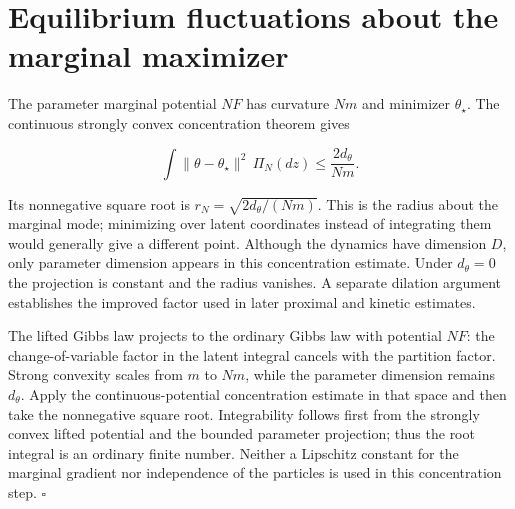 \documentclass[11pt,a4paper]{report}
\begin{document}
\section{\texorpdfstring{Equilibrium fluctuations about the marginal maximizer}{Equilibrium fluctuations about the marginal maximizer}}



The parameter marginal potential \(NF\) has curvature \(Nm\) and minimizer \(\theta_\star\). The continuous strongly convex concentration theorem \cite[Section~3.49.7]{LangevinLean2026ULASC} gives

\[\int\|\theta-\theta_\star\|^2\,\Pi_N(dz)\le\frac{2d_\theta}{Nm}.\]

Its nonnegative square root is \(r_N=\sqrt{2d_\theta/(Nm)}\). This is the radius about the marginal mode; minimizing over latent coordinates instead of integrating them would generally give a different point. Although the dynamics have dimension \(D\), only parameter dimension appears in this concentration estimate. Under \(d_\theta=0\) the projection is constant and the radius vanishes. A separate dilation argument establishes the improved factor used in later proximal and kinetic estimates.




The lifted Gibbs law projects to the ordinary Gibbs law with potential \(NF\): the change-of-variable factor in the latent integral cancels with the partition factor. Strong convexity scales from \(m\) to \(Nm\), while the parameter dimension remains \(d_\theta\). Apply the continuous-potential concentration estimate in that space and then take the nonnegative square root. Integrability follows first from the strongly convex lifted potential and the bounded parameter projection; thus the root integral is an ordinary finite number. Neither a Lipschitz constant for the marginal gradient nor independence of the particles is used in this concentration step. \(\square\)
\end{document}

